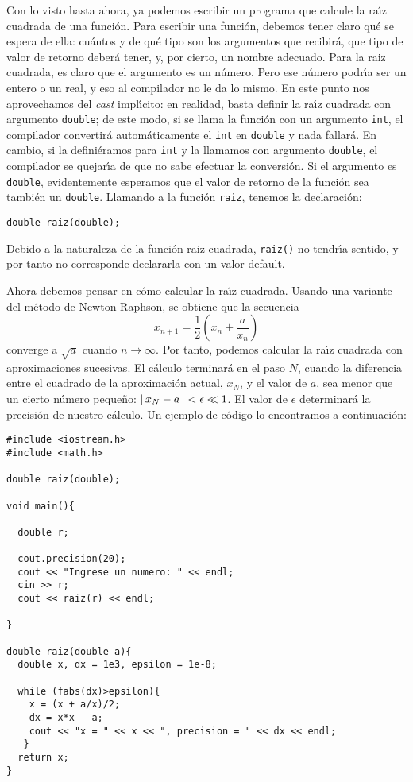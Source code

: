Con lo visto hasta ahora, ya podemos escribir un programa que calcule
la ra\'{\i}z cuadrada de una funci\'on. Para escribir una funci\'on,
debemos tener claro qu\'e se espera de ella: cu\'antos y de qu\'e tipo
son los argumentos que recibir\'a, que tipo de valor de retorno
deber\'a tener, y, por cierto, un nombre adecuado. Para la raiz
cuadrada, es claro que el argumento es un n\'umero. Pero ese n\'umero
podr\'{\i}a ser un entero o un real, y eso al compilador no le da lo
mismo. En este punto nos aprovechamos del {\em cast\/} impl\'{\i}cito:
en realidad, basta definir la ra\'{\i}z cuadrada con argumento
\verb+double+; de este modo, si se llama la funci\'on con un argumento
\verb+int+, el compilador convertir\'a autom\'aticamente el \verb+int+
en \verb+double+ y nada fallar\'a. En cambio, si la defini\'eramos
para \verb+int+ y la llamamos con argumento \verb+double+, el
compilador se quejar\'{\i}a de que no sabe efectuar la
conversi\'on. Si el argumento es \verb+double+, evidentemente
esperamos que el valor de retorno de la funci\'on sea tambi\'en un
\verb+double+. Llamando a la funci\'on \verb+raiz+, tenemos la
declaraci\'on:
\begin{verbatim}
double raiz(double);
\end{verbatim}
Debido a la naturaleza de la funci\'on raiz cuadrada, \verb+raiz()+ 
no tendr\'{\i}a sentido, y por tanto no corresponde
declararla con un valor default. 

Ahora debemos pensar en c\'omo calcular la ra\'{\i}z cuadrada. Usando
una variante del m\'etodo de Newton-Raphson, se obtiene que la secuencia
$$ x_{n+1} = \frac 12 \left(x_n + \frac a{x_n} \right)  $$
converge a $\sqrt{a}$ cuando $n\rightarrow\infty$. Por tanto, podemos
calcular la ra\'{\i}z cuadrada con aproximaciones sucesivas. El
c\'alculo terminar\'a en el paso $N$,  cuando la diferencia entre el
cuadrado de la
aproximaci\'on  actual, $x_{N}$, y el valor de $a$,  sea menor que
un cierto n\'umero peque\~no: $\left\lvert\, x_N - a \,\right\lvert < \epsilon \ll
1$. El valor de  $\epsilon$ determinar\'a la precisi\'on de
nuestro c\'alculo. Un ejemplo de c\'odigo lo encontramos a
continuaci\'on:
\begin{verbatim}
#include <iostream.h>
#include <math.h>

double raiz(double);

void main(){

  double r;

  cout.precision(20);
  cout << "Ingrese un numero: " << endl;
  cin >> r;
  cout << raiz(r) << endl;

}

double raiz(double a){
  double x, dx = 1e3, epsilon = 1e-8;

  while (fabs(dx)>epsilon){
    x = (x + a/x)/2;
    dx = x*x - a;
    cout << "x = " << x << ", precision = " << dx << endl;
   }
  return x;
}
\end{verbatim}

